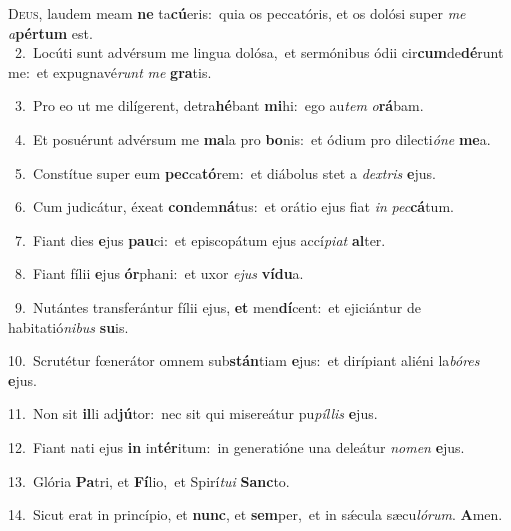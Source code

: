 \lettrine{\initial\textcolor{\initialcolor}{D}}{eus,} laudem meam \textbf{ne} ta\-\textbf{cú}\-eris:~\star quia os peccatóris, et os dolósi super \textit{me} \textit{a}\-\textbf{pér}\textbf{tum} est.\\
{\numbfont\textcolor{\numbcolor}{~2.}}~Locúti sunt advérsum me lingua dolósa,~\dagger et sermónibus ódii cir\-\textbf{cum}\-de\-\textbf{dé}\-runt me:~\star et expugnavé\textit{runt} \textit{me} \textbf{gra}\-tis.\par
{\numbfont\textcolor{\numbcolor}{~3.}}~Pro eo ut me dilígerent, detra\-\textbf{hé}\-bant \textbf{mi}\-hi:~\star ego au\textit{tem} \textit{o}\-\textbf{rá}bam.\par
{\numbfont\textcolor{\numbcolor}{~4.}}~Et posuérunt advérsum me \textbf{ma}\-la pro \textbf{bo}\-nis:~\star et ódium pro dilecti\-\textit{ó}\-\textit{ne} \textbf{me}\-a.\par
{\numbfont\textcolor{\numbcolor}{~5.}}~Constítue super eum \textbf{pec}\-ca\-\textbf{tó}\-rem:~\star et diábolus stet a \textit{dex}\-\textit{tris} \textbf{e}\-jus.\par
{\numbfont\textcolor{\numbcolor}{~6.}}~Cum judicátur, éxeat \textbf{con}\-dem\-\textbf{ná}\-tus:~\star et orátio ejus fiat \textit{in} \textit{pec}\-\textbf{cá}tum.\par
{\numbfont\textcolor{\numbcolor}{~7.}}~Fiant dies \textbf{e}\-jus \textbf{pau}\-ci:~\star et episcopátum ejus accí\-\textit{pi}\-\textit{at} \textbf{al}\-ter.\par
{\numbfont\textcolor{\numbcolor}{~8.}}~Fiant fílii \textbf{e}\-jus \textbf{ór}\-phani:~\star et uxor \textit{e}\-\textit{jus} \textbf{ví}\-\textbf{du}a.\par
{\numbfont\textcolor{\numbcolor}{~9.}}~Nutántes transferántur fílii ejus, \textbf{et} men\-\textbf{dí}\-cent:~\star et ejiciántur de habitatió\-\textit{ni}\-\textit{bus} \textbf{su}\-is.\par
{\numbfont\textcolor{\numbcolor}{10.}}~Scrutétur fœnerátor omnem sub\-\textbf{stán}\-tiam \textbf{e}\-jus:~\star et dirípiant aliéni la\-\textit{bó}\-\textit{res} \textbf{e}\-jus.\par
{\numbfont\textcolor{\numbcolor}{11.}}~Non sit \textbf{il}\-li ad\-\textbf{jú}\-tor:~\star nec sit qui misereátur pu\-\textit{píl}\-\textit{lis} \textbf{e}\-jus.\par
{\numbfont\textcolor{\numbcolor}{12.}}~Fiant nati ejus \textbf{in} in\-\textbf{tér}\-itum:~\star in generatióne una deleátur \textit{no}\-\textit{men} \textbf{e}\-jus.\par
{\numbfont\textcolor{\numbcolor}{13.}}~Glória \textbf{Pa}\-tri, et \textbf{Fí}\-lio,~\star et Spirí\-\textit{tu}\-\textit{i} \textbf{Sanc}\-to.\par
{\numbfont\textcolor{\numbcolor}{14.}}~Sicut erat in princípio, et \textbf{nunc}\-, et \textbf{sem}\-per,~\star et in sǽcula sæcu\-\textit{ló}\-\textit{rum}. \textbf{A}\-men.\par
